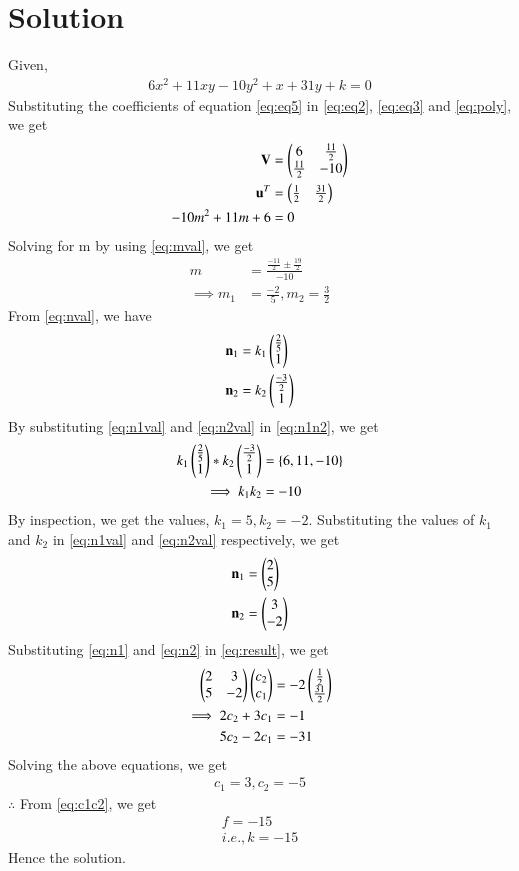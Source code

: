 \documentclass[journal,12pt,twocolumn]{IEEEtran}
\begin{document}
\section{Solution}
Given, 
\begin{align}
	6x^2 + 11xy - 10y^2 + x + 31y + k =0 \label{eq:eq5}
\end{align}
Substituting the coefficients of equation \eqref{eq:eq5} in \eqref{eq:eq2}, \eqref{eq:eq3} and \eqref{eq:poly}, we get
\begin{align}
	\mathbf{V} &= \begin{pmatrix}6 & \frac{11}{2} \\ \frac{11}{2} & -10\end{pmatrix}\\
	\mathbf{u}^T &= \begin{pmatrix}\frac{1}{2} & \frac{31}{2}\end{pmatrix} \\
	-10m^2 + 11m + 6 &= 0
\end{align}
Solving for m by using \eqref{eq:mval}, we get
\begin{align}
	m &= \frac{\frac{-11}{2} \pm \frac{19}{2}}{-10} \\ 
	\implies m_1 &= \frac{-2}{5}, m_2 = \frac{3}{2} 
\end{align}
From \eqref{eq:nval}, we have
\begin{align}
	\mathbf{n}_1 &= k_1 \begin{pmatrix} \frac{2}{5} \\ 1\end{pmatrix}  \label{eq:n1val}\\
	\mathbf{n}_2 &= k_2 \begin{pmatrix}\frac{-3}{2} \\ 1\end{pmatrix} \label{eq:n2val}
\end{align}
By substituting \eqref{eq:n1val} and \eqref{eq:n2val} in \eqref{eq:n1n2}, we get
\begin{align}
	k_1 \begin{pmatrix} \frac{2}{5} \\ 1\end{pmatrix} * k_2 \begin{pmatrix}\frac{-3}{2} \\ 1\end{pmatrix} &= \left\{6, 11, -10\right\}\\
	\implies k_1k_2 &= -10
\end{align} 
By inspection, we get the values, $k_1 = 5, k_2 = -2$. Substituting the values of $k_1$ and $k_2$ in \eqref{eq:n1val} and \eqref{eq:n2val} respectively, we get
\begin{align}
	\mathbf{n}_1 &= \begin{pmatrix}2 \\ 5\end{pmatrix} \label{eq:n1}\\
	\mathbf{n}_2 &= \begin{pmatrix}3 \\ -2\end{pmatrix} \label{eq:n2}
\end{align}
Substituting \eqref{eq:n1} and \eqref{eq:n2} in \eqref{eq:result}, we get
\begin{align}
       \begin{pmatrix}2 & 3\\ 5 & -2\end{pmatrix}\begin{pmatrix}c_2 \\ c_1\end{pmatrix} &= -2\begin{pmatrix}\frac{1}{2} \\ \frac{31}{2}\end{pmatrix}\\
       \implies 2c_2 + 3c_1 &= -1\\
       5c_2 - 2c_1 &= -31
\end{align}
Solving the above equations, we get
\begin{align}
	c_1 = 3, c_2 = -5
\end{align}
$\therefore$ From \eqref{eq:c1c2}, we get
\begin{align}
	f = -15\\
	i.e., \boxed{k = -15} \label{eq:kval}
\end{align}
Hence the solution.
\end{document}
